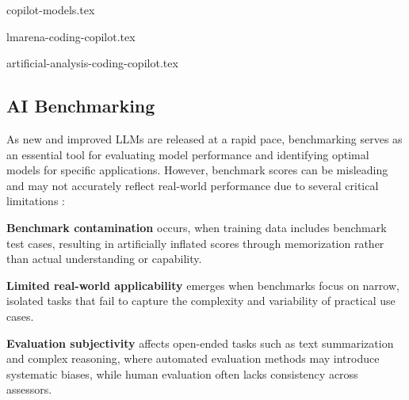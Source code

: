 \begin{table}[htpb]
  {copilot-models.tex}
  \caption{Information on GitHub Copilot model availability (retrieved 2025-08-05 \cite{copilot-models})}
  \label{tab:copilot-models-info}
\end{table}

\begin{table}[htbp]
  {lmarena-coding-copilot.tex}
  \caption{LMArena performance rankings for Copilot Pro models (retrieved 2025-07-24 \cite{lmarena-website})}
  \label{tab:lmarena-coding-copilot}
\end{table}

\begin{table}[htbp]
  \centering
  {artificial-analysis-coding-copilot.tex}
  \caption*{\textbf{Note:} gpt-4o = gpt-4o-2024-11-20 according to source \cite{artificial-analysis-models}; 
    filled circle: reasoning model; empty circle: non-reasoning model}
  \caption{Artificial Analysis benchmark scores for Copilot Pro models (Intelligence and Coding Index benchmarks; retrieved 2025-08-05 \cite{artificial-analysis-models})}
  \label{tab:artificial-analysis-coding-copilot}
\end{table}



\subsection{AI Benchmarking}

As new and improved LLMs are released at a rapid pace, benchmarking serves as an essential tool for evaluating model performance and identifying optimal models for specific applications.
However, benchmark scores can be misleading and may not accurately reflect real-world performance due to several critical limitations \cite{benchmark-contamination}\cite{trust-ai-benchmarks}:

\textbf{Benchmark contamination} occurs, when training data includes benchmark test cases, resulting in artificially inflated scores through memorization rather than actual understanding or capability.

\textbf{Limited real-world applicability} emerges when benchmarks focus on narrow, isolated tasks that fail to capture the complexity and variability of practical use cases.

\textbf{Evaluation subjectivity} affects open-ended tasks such as text summarization and complex reasoning, where automated evaluation methods may introduce systematic biases, while human evaluation often lacks consistency across assessors.


